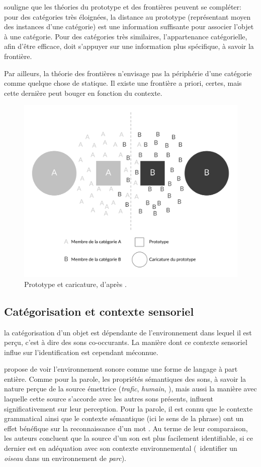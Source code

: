 \citep{goldstone2003concepts} souligne que les théories du prototype et des frontières peuvent se compléter: pour des catégories très éloignées, la distance au prototype (représentant moyen des instances d'une catégorie) est une information suffisante pour associer l'objet à une catégorie. Pour des catégories très similaires, l’appartenance catégorielle, afin d'être efficace, doit s'appuyer sur une information plus spécifique, à savoir la frontière.

Par ailleurs, la théorie des frontières n'envisage pas la périphérie d'une catégorie comme quelque chose de statique. Il existe une frontière a priori, certes, mais cette dernière peut bouger en fonction du contexte.

\begin{figure}[t]
        \myfloatalign
        \includegraphics[width=.8\linewidth]{gfx/ch_3/prototypeCaricature}
        \caption[Prototype et caricature.]{Prototype et caricature, d'après \citep{davis2010memory}.}\label{fig:prototypeCaricature}
\end{figure}

\subsection{Catégorisation et contexte sensoriel}
\label{sec:ch3_categoEtContexte}

la catégorisation d'un objet est dépendante de l'environnement dans lequel il est perçu, c'est à dire des sons co-occurants. La manière dont ce contexte sensoriel influe sur l'identification est cependant méconnue.

\citep{ballas1987interpreting} propose de voir l'environnement sonore comme une forme de langage à part entière. Comme pour la parole, les propriétés sémantiques des sons, à savoir la nature perçue de la source émettrice (\emph{trafic}, \emph{humain}, \etc), mais aussi la manière avec laquelle cette source s'accorde avec les autres sons présents, influent significativement sur leur perception. Pour la parole, il est connu que le contexte grammatical ainsi que le contexte sémantique (ici le sens de la phrase) ont un effet bénéfique sur la reconnaissance d'un mot \citep{bilger1984standardization}. Au terme de leur comparaison, les auteurs concluent que la source d'un son est plus facilement identifiable, si ce dernier est en adéquation avec son contexte environnemental (\eg~identifier un \emph{oiseau} dans un environnement de \emph{parc}).

